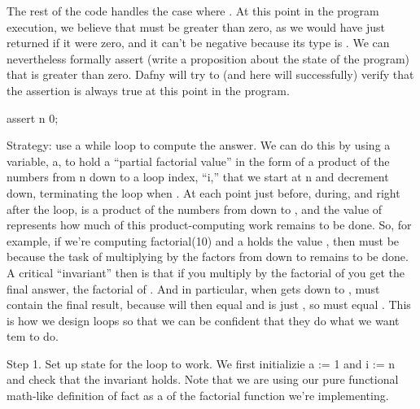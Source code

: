 \documentclass[letterpaper,10pt,english]{sphinxmanual}
\begin{document}
The rest of the code handles the case where . At this point in
the program execution, we believe that  must be greater than zero,
as we would have just returned if it were zero, and it can’t be
negative because its type is . We can nevertheless formally
assert (write a proposition about the state of the program) that 
is greater than zero. Dafny will try to (and here will successfully)
verify that the assertion is always true at this point in the program.

\begin{sphinxVerbatim}[commandchars=\\\{\}]
assert n \PYGZgt{} 0;
\end{sphinxVerbatim}

Strategy: use a while loop to compute the answer. We can do this by
using a variable, a, to hold a “partial factorial value” in the form
of a product of the numbers from n down to a loop index, “i,” that we
start at n and decrement down, terminating the loop when . At
each point just before, during, and right after the loop,  is a
product of the numbers from  down to , and the value of 
represents how much of this product-computing work remains to be
done. So, for example, if we’re computing factorial(10) and a holds
the value , then  must be  because the task of
multiplying  by the factors from  down to  remains to be
done. A critical “invariant” then is that if you multiply  by the
factorial of  you get the final answer, the factorial of .
And in particular, when  gets down to ,  must contain the
final result, because  will then equal  and
 is just , so  must equal . This is how we
design loops so that we can be confident that they do what we want
tem to do.

Step 1. Set up state for the loop to work. We first initializie a := 1
and i := n and check that the invariant holds. Note that we are using
our pure functional math-like definition of fact as a 
of the factorial function we’re implementing.
\end{document}

